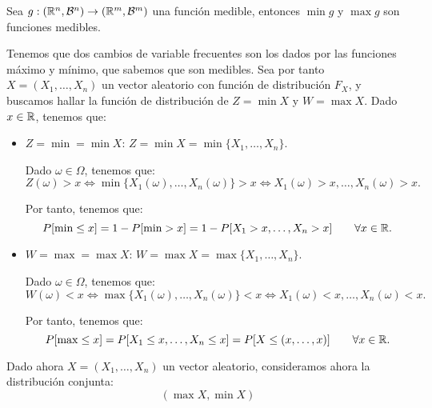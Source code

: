 \begin{prop}
    Sea $g:(\mathbb{R}^n, \mathcal{B}^n)\to (\mathbb{R}^m, \mathcal{B}^m)$ una función medible, entonces $\min g$ y $\max g$ son funciones medibles.
\end{prop}

Tenemos que dos cambios de variable frecuentes son los dados por las funciones máximo y mínimo, que sabemos que son medibles.
Sea por tanto $X=(X_1,\dots,X_n)$ un vector aleatorio con función de distribución $F_X$, y buscamos hallar la función de distribución de $Z=\min X$ y $W=\max X$.
Dado $x\in \mathbb{R}$, tenemos que:
\begin{itemize}
    \item \ul{$Z=\min = \min X$}: $Z=\min X = \min\{X_1,\dots,X_n\}$.
    
    Dado $\omega\in \Omega$, tenemos que:
    \begin{equation*}
        Z(\omega)>x \Longleftrightarrow \min\{X_1(\omega),\dots,X_n(\omega)\}>x \Longleftrightarrow X_1(\omega)>x,\dots,X_n(\omega)>x.
    \end{equation*}

    Por tanto, tenemos que:
    \begin{equation*}
        P[\min \leq x] = 1-P[\min > x] = 1-P[X_1>x,\dots,X_n>x]\qquad \forall x\in \mathbb{R}.
    \end{equation*}

    \item \ul{$W=\max = \max X$}: $W=\max X = \max\{X_1,\dots,X_n\}$.
    
    Dado $\omega\in \Omega$, tenemos que:
    \begin{equation*}
        W(\omega)<x \Longleftrightarrow \max\{X_1(\omega),\dots,X_n(\omega)\}<x \Longleftrightarrow X_1(\omega)<x,\dots,X_n(\omega)<x.
    \end{equation*}

    Por tanto, tenemos que:
    \begin{equation*}
        P[\max \leq x] = P[X_1\leq x,\dots,X_n\leq x]=P[X\leq (x,\dots,x)]\qquad \forall x\in \mathbb{R}.
    \end{equation*}
\end{itemize}

Dado ahora $X=(X_1,\dots,X_n)$ un vector aleatorio, consideramos ahora la distribución conjunta:
\begin{equation*}
    (\max X, \min X)
\end{equation*}


